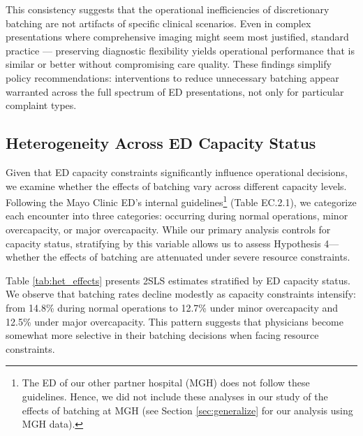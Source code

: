 \documentclass[,,blindrev]{informs}
\begin{document}
This consistency suggests that the operational inefficiencies of
discretionary batching are not artifacts of specific clinical scenarios.
Even in complex presentations where comprehensive imaging might seem
most justified, standard practice --- preserving diagnostic flexibility
yields operational performance that is similar or better without
compromising care quality. These findings simplify policy
recommendations: interventions to reduce unnecessary batching appear
warranted across the full spectrum of ED presentations, not only for
particular complaint types.

\subsection{Heterogeneity Across ED Capacity Status}\label{sec:HTEs}

Given that ED capacity constraints significantly influence operational
decisions, we examine whether the effects of batching vary across
different capacity levels. Following the Mayo Clinic ED's internal
guidelines\footnote{The ED of our other partner hospital (MGH) does not follow these guidelines. Hence, we did not include these analyses in our study of the effects of batching at MGH (see Section \ref{sec:generalize} for our analysis using MGH data).}
(Table EC.2.1), we categorize each encounter into three categories:
occurring during normal operations, minor overcapacity, or major
overcapacity. While our primary analysis controls for capacity status,
stratifying by this variable allows us to assess Hypothesis 4---whether
the effects of batching are attenuated under severe resource
constraints.

Table \ref{tab:het_effects} presents 2SLS estimates stratified by ED
capacity status. We observe that batching rates decline modestly as
capacity constraints intensify: from 14.8\% during normal operations to
12.7\% under minor overcapacity and 12.5\% under major overcapacity.
This pattern suggests that physicians become somewhat more selective in
their batching decisions when facing resource constraints.
\end{document}
